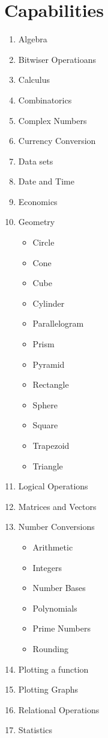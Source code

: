 \documentclass{article}
\begin{document}
	\section{Capabilities}
	\begin{enumerate}[label=\alph*) ]
		\item Algebra
		\item Bitwiser Operatioans
		\item Calculus
		\item Combinatorics
		\item Complex Numbers
		\item Currency Conversion
		\item Data sets
		\item Date and Time
		\item Economics
		\item Geometry
		\begin{itemize}
			\item Circle
			\item Cone
			\item Cube
			\item Cylinder
			\item Parallelogram
			\item Prism
			\item Pyramid
			\item Rectangle
			\item Sphere
			\item Square
			\item Trapezoid
			\item Triangle
		\end{itemize}
		\item Logical Operations
		\item Matrices and Vectors
		\item Number Conversions
		\begin{itemize}
			\item Arithmetic
			\item Integers
			\item Number Bases
			\item Polynomials
			\item Prime Numbers
			\item Rounding
		\end{itemize}
		\item Plotting a function
		\item Plotting Graphs
		\item Relational Operations
		\item Statistics

\end{enumerate}
\end{document}
